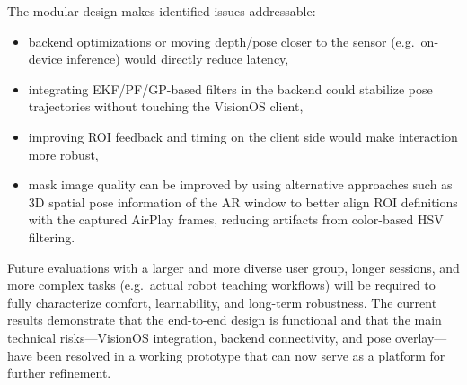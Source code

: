 The modular design makes identified issues addressable:

\begin{itemize}
    \item backend optimizations or moving depth/pose closer to the sensor (e.g.\ on-device inference) would directly reduce latency,
    \item integrating EKF/PF/GP-based filters in the backend could stabilize pose trajectories without touching the VisionOS client,
    \item improving ROI feedback and timing on the client side would make interaction more robust,
    \item mask image quality can be improved by using alternative approaches such as 3D spatial pose information of the AR window to better align ROI definitions with the captured AirPlay frames, reducing artifacts from color-based HSV filtering.
\end{itemize}

Future evaluations with a larger and more diverse user group, longer sessions, and more complex tasks (e.g.\ actual robot teaching workflows) will be required to fully characterize comfort, learnability, and long-term robustness. The current results demonstrate that the end-to-end design is functional and that the main technical risks—VisionOS integration, backend connectivity, and pose overlay—have been resolved in a working prototype that can now serve as a platform for further refinement.
